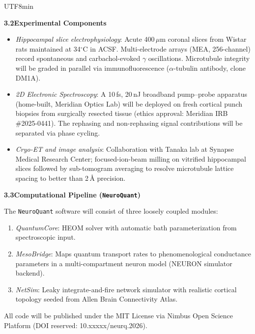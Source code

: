 \documentclass[11pt,a4paper]{article}
\newcommand{\bilabel}[2]{%
  \textbf{\textcolor{jspsNavy}{#1}}\enspace{\footnotesize\textcolor{jspsSlate}{(#2)}}%
}
\begin{document}
\begin{CJK}{UTF8}{min}
\begin{tcolorbox}[jspsSection,
  title={\faPen\enspace \bilabel{Research Methods}{研究方法} \hfill \small Section 3}]
\vspace{4pt}
\textbf{\textcolor{jspsNavy}{3.2\enspace Experimental Components}}

\begin{itemize}[leftmargin=1.4em, itemsep=1pt]
  \item \textit{Hippocampal slice electrophysiology}: Acute 400\,$\mu$m coronal slices from Wistar rats maintained at 34$^\circ$C in ACSF. Multi-electrode arrays (MEA, 256-channel) record spontaneous and carbachol-evoked $\gamma$ oscillations. Microtubule integrity will be graded in parallel via immunofluorescence ($\alpha$-tubulin antibody, clone DM1A).
  \item \textit{2D Electronic Spectroscopy}: A 10\,fs, 20\,nJ broadband pump--probe apparatus (home-built, Meridian Optics Lab) will be deployed on fresh cortical punch biopsies from surgically resected tissue (ethics approval: Meridian IRB \#2025-0441). The rephasing and non-rephasing signal contributions will be separated via phase cycling.
  \item \textit{Cryo-ET and image analysis}: Collaboration with Tanaka lab at Synapse Medical Research Center; focused-ion-beam milling on vitrified hippocampal slices followed by sub-tomogram averaging to resolve microtubule lattice spacing to better than 2\,\AA{} precision.
\end{itemize}

\vspace{4pt}
\textbf{\textcolor{jspsNavy}{3.3\enspace Computational Pipeline (\texttt{NeuroQuant})}}

The \texttt{NeuroQuant} software will consist of three loosely coupled modules:
\begin{enumerate}[leftmargin=1.6em, label=(\arabic*), itemsep=1pt]
  \item \textit{QuantumCore}: HEOM solver with automatic bath parameterization from spectroscopic input.
  \item \textit{MesoBridge}: Maps quantum transport rates to phenomenological conductance parameters in a multi-compartment neuron model (NEURON simulator backend).
  \item \textit{NetSim}: Leaky integrate-and-fire network simulator with realistic cortical topology seeded from Allen Brain Connectivity Atlas.
\end{enumerate}
All code will be published under the MIT License via Nimbus Open Science Platform (DOI reserved: 10.xxxxx/neurq.2026).

\end{tcolorbox}


\end{CJK}
\end{document}
